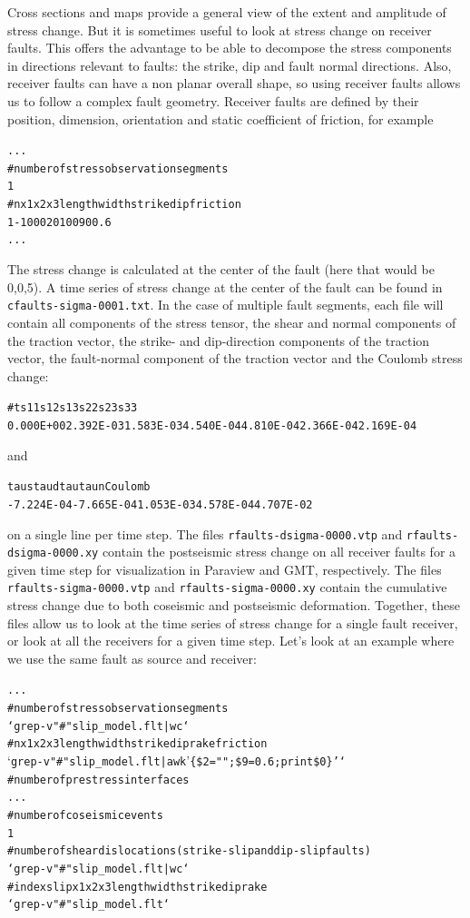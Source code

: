 \documentclass[10pt]{article}
\begin{document}
Cross sections and maps provide a general view of the extent and amplitude of stress change. But it is sometimes useful to look at stress change on receiver faults. This offers the advantage to be able to decompose the stress components in directions relevant to faults: the strike, dip and fault normal directions. Also, receiver faults can have a non planar overall shape, so using receiver faults allows us to follow a complex fault geometry. Receiver faults are defined by their position, dimension, orientation and static coefficient of friction, for example
\begin{alltt}
...
# number of stress observation segments
{\color{orange}1}
# n  x1 x2 x3 length width strike dip friction
{\color{orange}  1 -10  0  0     20    10      0  90      0.6}
...
\end{alltt}
The stress change is calculated at the center of the fault (here that would be 0,0,5). A time series of stress change at the center of the fault can be found in \verb'cfaults-sigma-0001.txt'. In the case of multiple fault segments, each file will contain all components of the stress tensor, the shear and normal components of the traction vector, the strike- and dip-direction components of the traction vector, the fault-normal component of the traction vector and the Coulomb stress change:
\begin{alltt}
#         t        s11        s12        s13        s22        s23        s33
{\color{NavyBlue}  0.000E+00  2.392E-03  1.583E-03  4.540E-04  4.810E-04  2.366E-04  2.169E-04}
\end{alltt}
and
\begin{alltt}
      taus       taud        tau       taun    Coulomb
{\color{NavyBlue}-7.224E-04 -7.665E-04  1.053E-03  4.578E-04  4.707E-02}
\end{alltt}
on a single line per time step. The files \verb'rfaults-dsigma-0000.vtp' and \verb'rfaults-dsigma-0000.xy' contain the postseismic stress change on all receiver faults for a given time step for visualization in Paraview and GMT, respectively. The files \verb'rfaults-sigma-0000.vtp' and \verb'rfaults-sigma-0000.xy' contain the cumulative stress change due to both coseismic and postseismic deformation. Together, these files allow us to look at the time series of stress change for a single fault receiver, or look at all the receivers for a given time step. Let's look at an example where we use the same fault as source and receiver:
\begin{alltt}
...
# number of stress observation segments
{\color{orange}`grep -v "#" slip_model.flt | wc`}
# n x1 x2 x3 length width strike dip rake friction
{\color{orange}`grep -v "#" slip_model.flt | awk '\{\$2="";\$9=0.6;print \$0\}'`}
# number of prestress interfaces
...
# number of coseismic events
1
# number of shear dislocations (strike-slip and dip-slip faults)
{\color{orange}`grep -v "#" slip_model.flt | wc`}
# index slip x1 x2 x3 length width strike dip rake
{\color{orange}`grep -v "#" slip_model.flt`}
\end{alltt}
\end{document}
